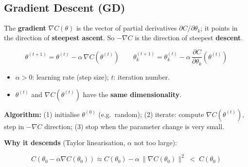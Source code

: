 \documentclass[10pt,a4paper]{article}
\begin{document}
	\subsection{Gradient Descent (GD)}

	\begin{definitionbox}
		The \textbf{gradient} $\nabla C(\theta)$ is the vector of partial derivatives $\partial C/\partial\theta_k$; it points in the direction of \textbf{steepest ascent}. So $-\nabla C$ is the direction of steepest \textbf{descent}.
	\end{definitionbox}

	\begin{formulabox}
		\[
		\theta^{(t+1)} = \theta^{(t)} - \alpha\,\nabla C\!\left(\theta^{(t)}\right)
		\qquad
		\theta_k^{(t+1)} = \theta_k^{(t)} - \alpha\,\frac{\partial C}{\partial \theta_k}\!\left(\theta^{(t)}\right)
		\]
	\end{formulabox}
	\begin{itemize}[leftmargin=*]
		\item $\alpha>0$: learning rate (step size); \quad $t$: iteration number.
		\item $\theta^{(t)}$ and $\nabla C(\theta^{(t)})$ have the \textbf{same dimensionality}.
	\end{itemize}

	\textbf{Algorithm:} (1) initialise $\theta^{(0)}$ (e.g.\ random); (2) iterate: compute $\nabla C(\theta^{(t)})$, step in $-\nabla C$ direction; (3) stop when the parameter change is very small.

	\textbf{Why it descends} (Taylor linearisation, $\alpha$ not too large):
	\begin{formulabox}
		\[
		C\!\left(\theta_0 - \alpha\nabla C(\theta_0)\right) \approx C(\theta_0) - \alpha\,\lVert\nabla C(\theta_0)\rVert^2 \;<\; C(\theta_0)
		\]
	\end{formulabox}

	\begin{center}
	\end{center}
\end{document}
